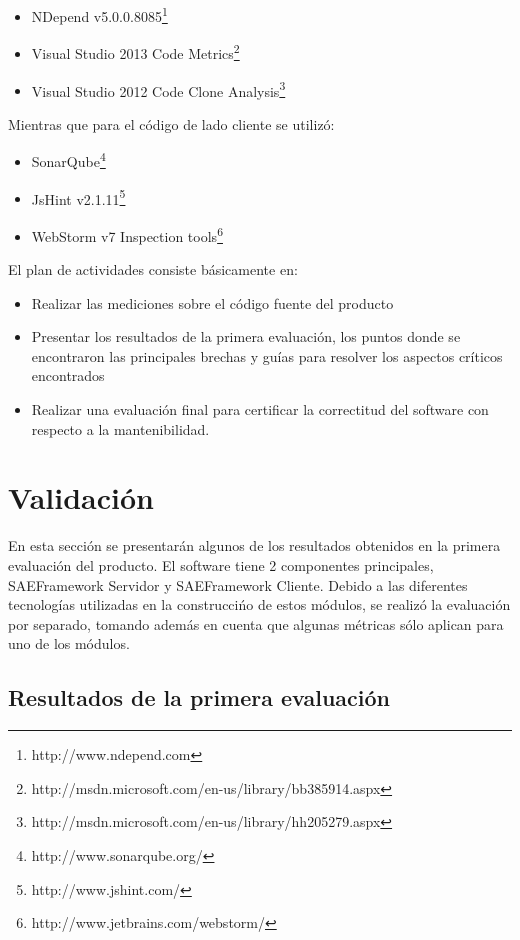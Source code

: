 \documentclass[letterpaper]{article}
\begin{document}
\begin{itemize}
	\item NDepend v5.0.0.8085\footnote{http://www.ndepend.com}
	\item Visual Studio 2013 Code Metrics\footnote{http://msdn.microsoft.com/en-us/library/bb385914.aspx}
	\item Visual Studio 2012 Code Clone Analysis\footnote{http://msdn.microsoft.com/en-us/library/hh205279.aspx}
\end{itemize}

Mientras que para el código de lado cliente se utilizó:
\begin{itemize}
	\item SonarQube\footnote{http://www.sonarqube.org/}
	\item JsHint v2.1.11\footnote{http://www.jshint.com/}
	\item WebStorm v7 Inspection tools\footnote{http://www.jetbrains.com/webstorm/}
\end{itemize}

El plan de actividades consiste básicamente en:
\begin{itemize}
	\item Realizar las mediciones sobre el código fuente del producto
	\item Presentar los resultados de la primera evaluación, los puntos
	donde se encontraron las principales brechas y guías
	para resolver los aspectos críticos encontrados
	\item Realizar una evaluación final para certificar la correctitud
	del software con respecto a la mantenibilidad.
\end{itemize}

\section{Validación}
En esta sección se presentarán algunos de los resultados obtenidos en la
primera evaluación del producto. El software tiene 2 componentes principales,
SAEFramework Servidor y SAEFramework Cliente. Debido a las diferentes tecnologías
utilizadas en la construccińo de estos módulos, se realizó la evaluación por
separado, tomando además en cuenta que algunas métricas sólo aplican para uno
de los módulos.

\subsection{Resultados de la primera evaluación}
\end{document}
